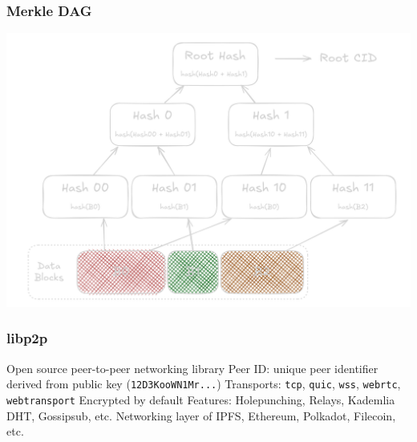 \documentclass{../shipyard-slide}
\begin{document}
\begin{frame}
  \frametitle{Merkle DAG}
  \begin{center}
  \includegraphics[width=.7\linewidth]{resources/cid.png}
  \end{center}
\end{frame}

\begin{frame}
  \frametitle{libp2p}
  \begin{itemize}
    \itemc Open source peer-to-peer networking library
    \itemc Peer ID: unique peer identifier derived from public key (\texttt{12D3KooWN1Mr...})
    \itemc Transports: \texttt{tcp}, \texttt{quic}, \texttt{wss}, \texttt{webrtc}, \texttt{webtransport}
    \itemc Encrypted by default
    \itemc Features: Holepunching, Relays, Kademlia DHT, Gossipsub, etc.
    \itemc Networking layer of IPFS, Ethereum, Polkadot, Filecoin, etc.
  \end{itemize}
\end{frame}
\end{document}
